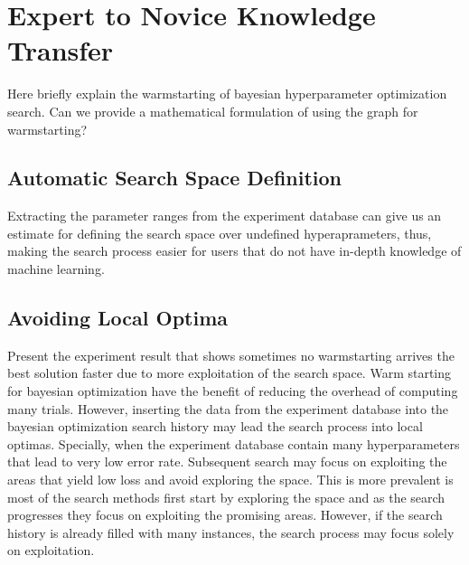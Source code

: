 \section{Expert to Novice Knowledge Transfer} \label{sec-expert-to-novice}
Here briefly explain the warmstarting of bayesian hyperparameter optimization search.
Can we provide a mathematical formulation of using the graph for warmstarting?

\subsection{Automatic Search Space Definition}
Extracting the parameter ranges from the experiment database can give us an estimate for defining the search space over undefined hyperaprameters, thus, making the search process easier for users that do not have in-depth knowledge of machine learning.

\subsection{Avoiding Local Optima}
Present the experiment result that shows sometimes no warmstarting arrives the best solution faster due to more exploitation of the search space.
Warm starting for bayesian optimization have the benefit of reducing the overhead of computing many trials.
However, inserting the data from the experiment database into the bayesian optimization search history may lead the search process into local optimas.
Specially, when the experiment database contain many hyperparameters that lead to very low error rate.
Subsequent search may focus on exploiting the areas that yield low loss and avoid exploring the space.
This is more prevalent is most of the search methods first start by exploring the space and as the search progresses they focus on exploiting the promising areas.
However, if the search history is already filled with many instances, the search process may focus solely on exploitation.


